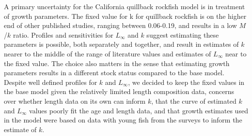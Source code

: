 \documentclass[11pt,
  english,
  a4paper,
]{article}
\begin{document}
A primary uncertainty for the California quillback rockfish model is in treatment of growth parameters. The fixed value for k for quillback rockfish is on the higher end of other published studies, ranging between 0.06-0.19, and results in a low {\(M\)\leavevmode\tagmcend\tagstructend}/{\(k\)\leavevmode\tagmcend\tagstructend} ratio. Profiles and sensitivities for {\(L_{\infty}\)\leavevmode\tagmcend\tagstructend} and {\(k\)\leavevmode\tagmcend\tagstructend} suggest estimating these parameters is possible, both separately and together, and result in estimates of {\(k\)\leavevmode\tagmcend\tagstructend} nearer to the middle of the range of literature values and estimates of {\(L_{\infty}\)\leavevmode\tagmcend\tagstructend} near to the fixed value. The choice also matters in the sense that estimating growth parameters results in a different stock status compared to the base model. Despite well defined profiles for {\(k\)\leavevmode\tagmcend\tagstructend} and {\(L_{\infty}\)\leavevmode\tagmcend\tagstructend}, we decided to keep the fixed values in the base model given the relatively limited length composition data, concerns over whether length data on its own can inform {\(k\)\leavevmode\tagmcend\tagstructend}, that the curve of estimated {\(k\)\leavevmode\tagmcend\tagstructend} and {\(L_{\infty}\)\leavevmode\tagmcend\tagstructend} values poorly fit the age and length data, and that growth estimates used in the model were based on data with young fish from the surveys to inform the estimate of {\(k\)\leavevmode\tagmcend\tagstructend}.

\leavevmode\tagmcend\tagstructend\par

\end{document}
